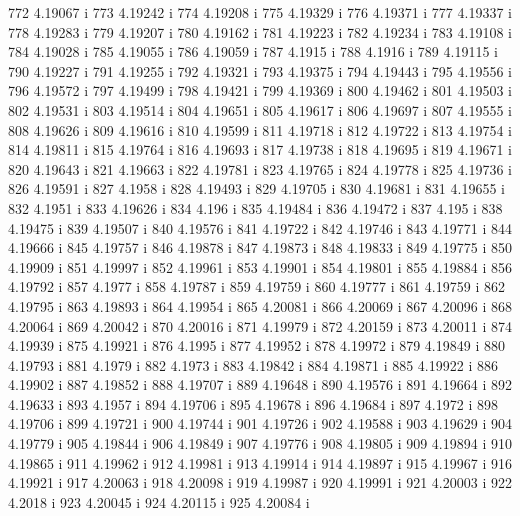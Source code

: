  772  4.19067  i
 773  4.19242  i
 774  4.19208  i
 775  4.19329  i
 776  4.19371  i
 777  4.19337  i
 778  4.19283  i
 779  4.19207  i
 780  4.19162  i
 781  4.19223  i
 782  4.19234  i
 783  4.19108  i
 784  4.19028  i
 785  4.19055  i
 786  4.19059  i
 787  4.1915  i
 788  4.1916  i
 789  4.19115  i
 790  4.19227  i
 791  4.19255  i
 792  4.19321  i
 793  4.19375  i
 794  4.19443  i
 795  4.19556  i
 796  4.19572  i
 797  4.19499  i
 798  4.19421  i
 799  4.19369  i
 800  4.19462  i
 801  4.19503  i
 802  4.19531  i
 803  4.19514  i
 804  4.19651  i
 805  4.19617  i
 806  4.19697  i
 807  4.19555  i
 808  4.19626  i
 809  4.19616  i
 810  4.19599  i
 811  4.19718  i
 812  4.19722  i
 813  4.19754  i
 814  4.19811  i
 815  4.19764  i
 816  4.19693  i
 817  4.19738  i
 818  4.19695  i
 819  4.19671  i
 820  4.19643  i
 821  4.19663  i
 822  4.19781  i
 823  4.19765  i
 824  4.19778  i
 825  4.19736  i
 826  4.19591  i
 827  4.1958  i
 828  4.19493  i
 829  4.19705  i
 830  4.19681  i
 831  4.19655  i
 832  4.1951  i
 833  4.19626  i
 834  4.196  i
 835  4.19484  i
 836  4.19472  i
 837  4.195  i
 838  4.19475  i
 839  4.19507  i
 840  4.19576  i
 841  4.19722  i
 842  4.19746  i
 843  4.19771  i
 844  4.19666  i
 845  4.19757  i
 846  4.19878  i
 847  4.19873  i
 848  4.19833  i
 849  4.19775  i
 850  4.19909  i
 851  4.19997  i
 852  4.19961  i
 853  4.19901  i
 854  4.19801  i
 855  4.19884  i
 856  4.19792  i
 857  4.1977  i
 858  4.19787  i
 859  4.19759  i
 860  4.19777  i
 861  4.19759  i
 862  4.19795  i
 863  4.19893  i
 864  4.19954  i
 865  4.20081  i
 866  4.20069  i
 867  4.20096  i
 868  4.20064  i
 869  4.20042  i
 870  4.20016  i
 871  4.19979  i
 872  4.20159  i
 873  4.20011  i
 874  4.19939  i
 875  4.19921  i
 876  4.1995  i
 877  4.19952  i
 878  4.19972  i
 879  4.19849  i
 880  4.19793  i
 881  4.1979  i
 882  4.1973  i
 883  4.19842  i
 884  4.19871  i
 885  4.19922  i
 886  4.19902  i
 887  4.19852  i
 888  4.19707  i
 889  4.19648  i
 890  4.19576  i
 891  4.19664  i
 892  4.19633  i
 893  4.1957  i
 894  4.19706  i
 895  4.19678  i
 896  4.19684  i
 897  4.1972  i
 898  4.19706  i
 899  4.19721  i
 900  4.19744  i
 901  4.19726  i
 902  4.19588  i
 903  4.19629  i
 904  4.19779  i
 905  4.19844  i
 906  4.19849  i
 907  4.19776  i
 908  4.19805  i
 909  4.19894  i
 910  4.19865  i
 911  4.19962  i
 912  4.19981  i
 913  4.19914  i
 914  4.19897  i
 915  4.19967  i
 916  4.19921  i
 917  4.20063  i
 918  4.20098  i
 919  4.19987  i
 920  4.19991  i
 921  4.20003  i
 922  4.2018  i
 923  4.20045  i
 924  4.20115  i
 925  4.20084  i

